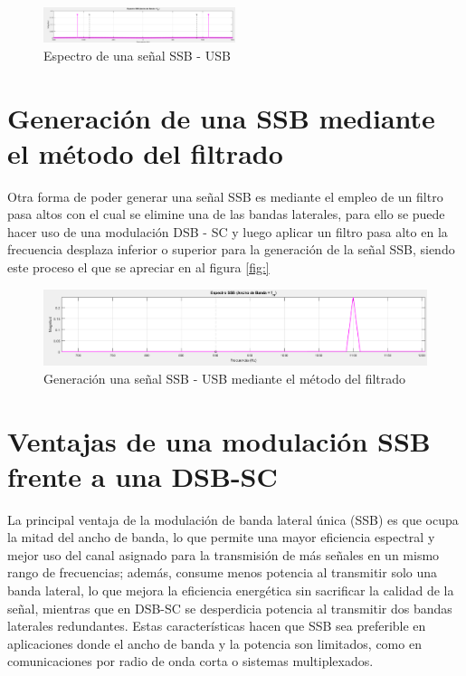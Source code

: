 \documentclass[conference]{IEEEtran}
\begin{document}
	\begin{figure}[h]
		\centering
		\includegraphics[width=0.5\textwidth]{media/modulacion-usb}
		\caption{Espectro de una señal SSB - USB}
		\label{fig:modulacion-usb}
	\end{figure}	
	
	\section{Generación de una SSB mediante el método del filtrado}
	Otra forma de poder generar una señal SSB es mediante el empleo de un filtro pasa altos con el cual se elimine una de las bandas laterales, para ello se puede hacer uso de una modulación DSB - SC y luego aplicar un filtro pasa alto en la frecuencia desplaza inferior o superior para la generación de la señal SSB, siendo este proceso el que se apreciar en al figura \ref{fig:}
	
	\begin{figure}[h]
		\centering
		\includegraphics[width=0.5\linewidth]{media/generacion-usb}
		\caption{Generación una señal SSB - USB mediante el método del filtrado}
		\label{fig:generacion-usb}
	\end{figure}
	
	\section{Ventajas de una modulación SSB frente a una DSB-SC}
	
	La principal ventaja de la modulación de banda lateral única (SSB) es que ocupa la mitad del ancho de banda, lo que permite una mayor eficiencia espectral y mejor uso del canal asignado para la transmisión de más señales en un mismo rango de frecuencias; además, consume menos potencia al transmitir solo una banda lateral, lo que mejora la eficiencia energética sin sacrificar la calidad de la señal, mientras que en DSB-SC se desperdicia potencia al transmitir dos bandas laterales redundantes. Estas características hacen que SSB sea preferible en aplicaciones donde el ancho de banda y la potencia son limitados, como en comunicaciones por radio de onda corta o sistemas multiplexados.
	
\end{document}
